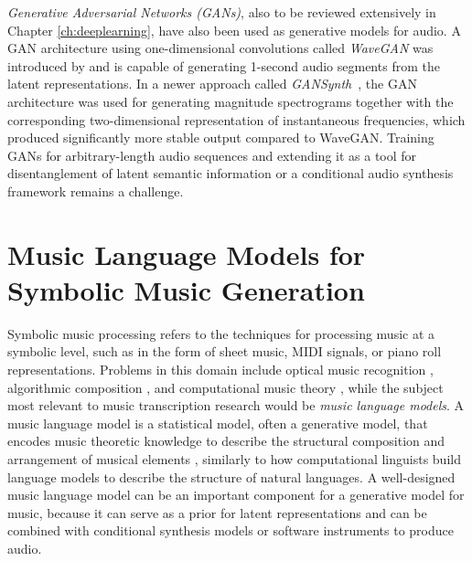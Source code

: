 \textit{Generative Adversarial Networks (GANs)}, also to be reviewed extensively in Chapter \ref{ch:deeplearning}, have also been used as generative models for audio.
A GAN architecture using one-dimensional convolutions called \emph{WaveGAN} was introduced by  and is capable of generating 1-second audio segments from the latent representations.
In a newer approach called \emph{GANSynth}~\cite{engel2019gansynth}, the GAN architecture was used for generating magnitude spectrograms together with the corresponding two-dimensional representation of instantaneous frequencies, which produced significantly more stable output compared to WaveGAN.
Training GANs for arbitrary-length audio sequences and extending it as a tool for disentanglement of latent semantic information or a conditional audio synthesis framework remains a challenge.

\section{Music Language Models for Symbolic Music Generation}

Symbolic music processing refers to the techniques for processing music at a symbolic level, such as in the form of sheet music, MIDI signals, or piano roll representations.
Problems in this domain include optical music recognition \cite{rebelo2012omr}, algorithmic composition \cite{fernandez2013ai}, and computational music theory \cite{hamanaka2013computational}, while the subject most relevant to music transcription research would be \emph{music language models}.
A music language model is a statistical model, often a generative model, that encodes music theoretic knowledge to describe the structural composition and arrangement of musical elements \cite{patel2008musiclanguage}, similarly to how computational linguists build language models to describe the structure of natural languages.
A well-designed music language model can be an important component for a generative model for music, because it can serve as a prior for latent representations and can be combined with conditional synthesis models or software instruments to produce audio.

